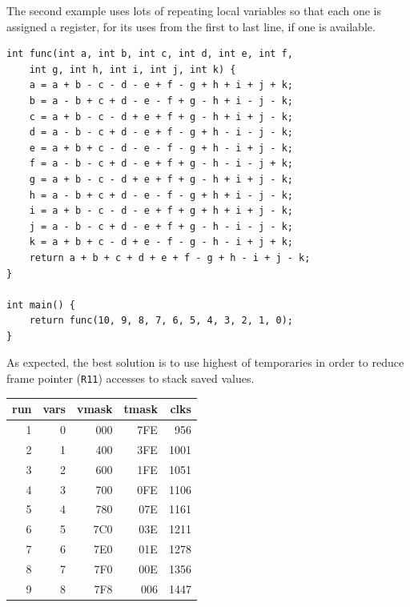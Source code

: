\documentclass[journal]{IEEEtran}
\begin{document}
The second example uses lots of repeating local variables so that each one is assigned
a register, for its uses from the first to last line, if one is available.
{\small
\begin{verbatim}
int func(int a, int b, int c, int d, int e, int f,
    int g, int h, int i, int j, int k) {
    a = a + b - c - d - e + f - g + h + i + j + k;
    b = a - b + c + d - e - f + g - h + i - j - k;
    c = a + b - c - d + e + f + g - h + i + j - k;
    d = a - b - c + d - e + f - g + h - i - j - k;
    e = a + b + c - d - e - f - g + h - i + j - k;
    f = a - b - c + d - e + f + g - h - i - j + k;
    g = a + b - c - d + e + f + g - h + i + j - k;
    h = a - b + c + d - e - f - g + h + i - j - k;
    i = a + b - c - d - e + f + g + h + i + j - k;
    j = a - b - c + d - e + f + g - h - i - j - k;
    k = a + b + c - d + e - f - g - h - i + j + k;
    return a + b + c + d + e + f - g + h - i + j - k;
}

int main() {
    return func(10, 9, 8, 7, 6, 5, 4, 3, 2, 1, 0);
}
\end{verbatim}
}
As expected, the best solution is to use highest of temporaries in order
to reduce frame pointer ({\tt R11}) accesses to stack saved values.
\begin{center}
{\small
\begin{tabular}{r|r|r|r|r}
run&vars&vmask&tmask&clks\\\hline
1&0&000&7FE&956\\
2&1&400&3FE&1001\\
3&2&600&1FE&1051\\
4&3&700&0FE&1106\\
5&4&780&07E&1161\\
6&5&7C0&03E&1211\\
7&6&7E0&01E&1278\\
8&7&7F0&00E&1356\\
9&8&7F8&006&1447\\
\end{tabular}
}
\end{center}
\end{document}
